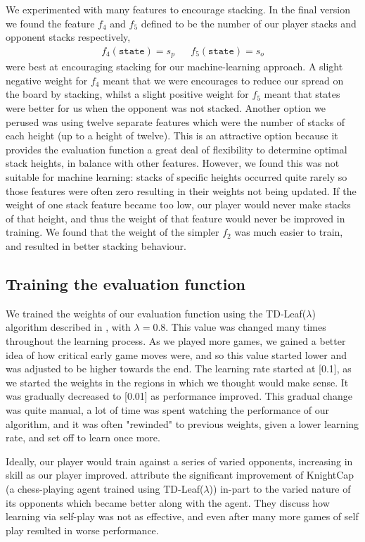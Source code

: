 \documentclass[11pt]{article}
\newcommand{\drafting}[1]{\textcolor{OliveGreen}{#1}}
\begin{document}
We experimented with many features to encourage stacking. In the final version we found the feature $f_4$ and $f_5$ defined to be the number of our player stacks and opponent stacks respectively,
\begin{align*}
    f_4(\texttt{state}) = s_p && f_5(\texttt{state}) = s_o
\end{align*}
were best at encouraging stacking for our machine-learning approach. A slight negative weight for $f_4$ meant that we were encourages to reduce our spread on the board by stacking, whilst a slight positive weight for $f_5$ meant that states were better for us when the opponent was not stacked. Another option we perused was using twelve separate features which were the number of stacks of each height (up to a height of twelve). This is an attractive option because it provides the evaluation function a great deal of flexibility to determine optimal stack heights, in balance with other features. However, we found this was not suitable for machine learning: stacks of specific heights occurred quite rarely so those features were often zero resulting in their weights not being updated. If the weight of one stack feature became too low, our player would never make stacks of that height, and thus the weight of that feature would never be improved in training. We found that the weight of the simpler $f_2$ was much easier to train, and resulted in better stacking behaviour.

\subsection{Training the evaluation function}
We trained the weights of our evaluation function using the TD-Leaf($\lambda$) algorithm described in \cite{baxter_tdleaflambda_1999}, with $\lambda = $\drafting{0.8. This value was changed many times throughout the learning process. As we played more games, we gained a better idea of how critical early game moves were, and so this value started lower and was adjusted to be higher towards the end. The learning rate started at [\drafting{0.1}], as we started the weights in the regions in which we thought would make sense. It was gradually decreased to [\drafting{0.01}] as performance improved. This gradual change was quite manual, a lot of time was spent watching the performance of our algorithm, and it was often "rewinded" to previous weights, given a lower learning rate, and set off to learn once more.}

Ideally, our player would train against a series of varied opponents, increasing in skill as our player improved. \cite{baxter_tdleaflambda_1999} attribute the significant improvement of KnightCap (a chess-playing agent trained using TD-Leaf($\lambda$)) in-part to the varied nature of its opponents which became better along with the agent. They discuss how learning via self-play was not as effective, and even after many more games of self play resulted in worse performance. 
\end{document}
